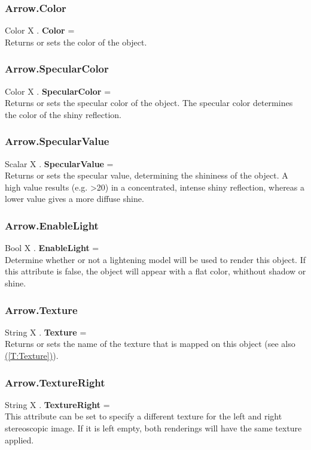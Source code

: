 \documentclass[10pt]{book}
\newcommand{\linkitem}[1]{\hyperref[#1]{\nameref{#1} (\ref{#1})}}
\begin{document}
\subsubsection{Arrow.Color \label{F:Arrow:Color}}
Color X . \textbf{Color} = \\
Returns or sets the color of the object.

\subsubsection{Arrow.SpecularColor \label{F:Arrow:SpecularColor}}
Color X . \textbf{SpecularColor} = \\
Returns or sets the specular color of the object. The specular color determines the color of the shiny reflection.

\subsubsection{Arrow.SpecularValue \label{F:Arrow:SpecularValue}}
Scalar X . \textbf{SpecularValue} = \\
Returns or sets the specular value, determining the shininess of the object. A high value results (e.g. >20) in a concentrated, intense shiny reflection, whereas a lower value gives a more diffuse shine.

\subsubsection{Arrow.EnableLight \label{F:Arrow:EnableLight}}
Bool X . \textbf{EnableLight} = \\
Determine whether or not a lightening model will be used to render this object. If this attribute is false, the object will appear with a flat color, whithout shadow or shine.

\subsubsection{Arrow.Texture \label{F:Arrow:Texture}}
String X . \textbf{Texture} = \\
Returns or sets the name of the texture that is mapped on this object (see also \linkitem{T:Texture}).

\subsubsection{Arrow.TextureRight \label{F:Arrow:TextureRight}}
String X . \textbf{TextureRight} = \\
This attribute can be set to specify a different texture for the left and right stereoscopic image. If it is left empty, both renderings will have the same texture applied.
\end{document}
